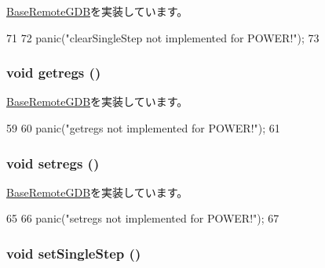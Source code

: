 \hyperlink{classBaseRemoteGDB_a69f1887d1310ab6f19cf5bbcdf9d7a1e}{BaseRemoteGDB}を実装しています。


\begin{DoxyCode}
71     {
72         panic("clearSingleStep not implemented for POWER!");
73     }
\end{DoxyCode}
\hypertarget{classPowerISA_1_1RemoteGDB_a62bc8adc5a48f1cbb5eb9bb64301d38d}{
\subsubsection[{getregs}]{\setlength{\rightskip}{0pt plus 5cm}void getregs ()}}
\label{classPowerISA_1_1RemoteGDB_a62bc8adc5a48f1cbb5eb9bb64301d38d}


\hyperlink{classBaseRemoteGDB_aca04756a764f2ef2add9ee91be012659}{BaseRemoteGDB}を実装しています。


\begin{DoxyCode}
59     {
60         panic("getregs not implemented for POWER!");
61     }
\end{DoxyCode}
\hypertarget{classPowerISA_1_1RemoteGDB_a2051121b6bc93c8ca3856bbeeca7bdc1}{
\subsubsection[{setregs}]{\setlength{\rightskip}{0pt plus 5cm}void setregs ()}}
\label{classPowerISA_1_1RemoteGDB_a2051121b6bc93c8ca3856bbeeca7bdc1}


\hyperlink{classBaseRemoteGDB_a6b0b51dc196f12756cc0ec49a3ae6a6a}{BaseRemoteGDB}を実装しています。


\begin{DoxyCode}
65     {
66         panic("setregs not implemented for POWER!");
67     }
\end{DoxyCode}
\hypertarget{classPowerISA_1_1RemoteGDB_a40d5da340fdb741de8cd3ffbc69708fe}{
\subsubsection[{setSingleStep}]{\setlength{\rightskip}{0pt plus 5cm}void setSingleStep ()}}
\label{classPowerISA_1_1RemoteGDB_a40d5da340fdb741de8cd3ffbc69708fe}


